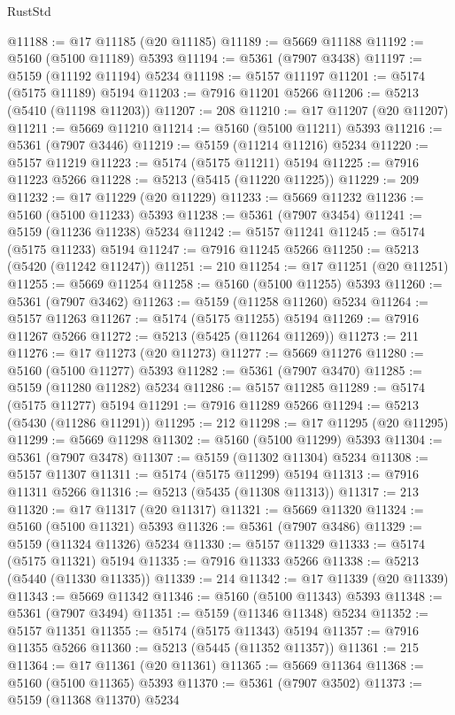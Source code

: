 \begin{lexlean}{RustStd}
\begin{coremodule}
@11188 := @17 @11185 (@20 @11185)
@11189 := @5669 @11188
@11192 := @5160 (@5100 @11189) @5393
@11194 := @5361 (@7907 @3438)
@11197 := @5159 (@11192 @11194) @5234
@11198 := @5157 @11197
@11201 := @5174 (@5175 @11189) @5194
@11203 := @7916 @11201 @5266
@11206 := @5213 (@5410 (@11198 @11203))
@11207 := 208
@11210 := @17 @11207 (@20 @11207)
@11211 := @5669 @11210
@11214 := @5160 (@5100 @11211) @5393
@11216 := @5361 (@7907 @3446)
@11219 := @5159 (@11214 @11216) @5234
@11220 := @5157 @11219
@11223 := @5174 (@5175 @11211) @5194
@11225 := @7916 @11223 @5266
@11228 := @5213 (@5415 (@11220 @11225))
@11229 := 209
@11232 := @17 @11229 (@20 @11229)
@11233 := @5669 @11232
@11236 := @5160 (@5100 @11233) @5393
@11238 := @5361 (@7907 @3454)
@11241 := @5159 (@11236 @11238) @5234
@11242 := @5157 @11241
@11245 := @5174 (@5175 @11233) @5194
@11247 := @7916 @11245 @5266
@11250 := @5213 (@5420 (@11242 @11247))
@11251 := 210
@11254 := @17 @11251 (@20 @11251)
@11255 := @5669 @11254
@11258 := @5160 (@5100 @11255) @5393
@11260 := @5361 (@7907 @3462)
@11263 := @5159 (@11258 @11260) @5234
@11264 := @5157 @11263
@11267 := @5174 (@5175 @11255) @5194
@11269 := @7916 @11267 @5266
@11272 := @5213 (@5425 (@11264 @11269))
@11273 := 211
@11276 := @17 @11273 (@20 @11273)
@11277 := @5669 @11276
@11280 := @5160 (@5100 @11277) @5393
@11282 := @5361 (@7907 @3470)
@11285 := @5159 (@11280 @11282) @5234
@11286 := @5157 @11285
@11289 := @5174 (@5175 @11277) @5194
@11291 := @7916 @11289 @5266
@11294 := @5213 (@5430 (@11286 @11291))
@11295 := 212
@11298 := @17 @11295 (@20 @11295)
@11299 := @5669 @11298
@11302 := @5160 (@5100 @11299) @5393
@11304 := @5361 (@7907 @3478)
@11307 := @5159 (@11302 @11304) @5234
@11308 := @5157 @11307
@11311 := @5174 (@5175 @11299) @5194
@11313 := @7916 @11311 @5266
@11316 := @5213 (@5435 (@11308 @11313))
@11317 := 213
@11320 := @17 @11317 (@20 @11317)
@11321 := @5669 @11320
@11324 := @5160 (@5100 @11321) @5393
@11326 := @5361 (@7907 @3486)
@11329 := @5159 (@11324 @11326) @5234
@11330 := @5157 @11329
@11333 := @5174 (@5175 @11321) @5194
@11335 := @7916 @11333 @5266
@11338 := @5213 (@5440 (@11330 @11335))
@11339 := 214
@11342 := @17 @11339 (@20 @11339)
@11343 := @5669 @11342
@11346 := @5160 (@5100 @11343) @5393
@11348 := @5361 (@7907 @3494)
@11351 := @5159 (@11346 @11348) @5234
@11352 := @5157 @11351
@11355 := @5174 (@5175 @11343) @5194
@11357 := @7916 @11355 @5266
@11360 := @5213 (@5445 (@11352 @11357))
@11361 := 215
@11364 := @17 @11361 (@20 @11361)
@11365 := @5669 @11364
@11368 := @5160 (@5100 @11365) @5393
@11370 := @5361 (@7907 @3502)
@11373 := @5159 (@11368 @11370) @5234

\end{coremodule}
\end{lexlean}
